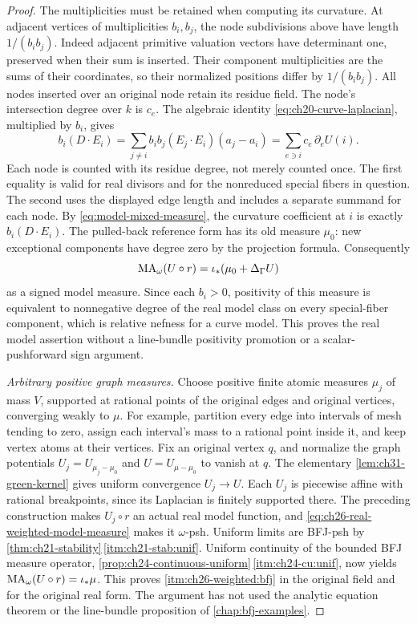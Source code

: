 \begin{proof}
The multiplicities must be retained when computing its curvature.  At
adjacent vertices of multiplicities \(b_i,b_j\), the node subdivisions
above have length \(1/(b_i b_j)\).  Indeed adjacent primitive valuation
vectors have determinant one, preserved when their sum is inserted.
Their component multiplicities are the sums of their coordinates, so
their normalized positions differ by \(1/(b_i b_j)\).
All nodes inserted over an original node retain its residue field.
The node's intersection degree over
\(k\) is \(c_e\).  The algebraic identity
\eqref{eq:ch20-curve-laplacian}, multiplied by \(b_i\), gives
\[
 b_i(D\cdot E_i)
   =\sum_{j\ne i}b_i b_j(E_j\cdot E_i)(a_j-a_i)
   =\sum_{e\ni i}c_e\,\partial_e U(i).
\]
Each node is counted with its residue degree, not merely counted once.
The first equality is valid for real divisors and for the nonreduced
special fibers in question.  The second uses the displayed edge length
and includes a separate summand for each node.
By \eqref{eq:model-mixed-measure}, the curvature coefficient at \(i\)
is exactly \(b_i(D\cdot E_i)\).  The pulled-back reference form has its
old measure \(\mu_0\): new exceptional components have degree zero by
the projection formula.  Consequently
\begin{equation}
\label{eq:ch26-real-weighted-model-measure}
 \operatorname{MA}_\omega(U\circ r)=\iota_*(\mu_0+\Delta_\Gamma U)
\end{equation}
as a signed model measure.  Since each \(b_i>0\), positivity of this
measure is equivalent to nonnegative degree of the real model class on
every special-fiber component, which is relative nefness for a curve
model.  This proves the real model assertion without a line-bundle
positivity promotion or a scalar-pushforward sign argument.

\emph{Arbitrary positive graph measures.}
Choose positive finite atomic measures \(\mu_j\) of mass \(V\), supported
at rational points of the original edges and original vertices, converging
weakly to \(\mu\).  For example, partition every edge into intervals
of mesh tending to zero, assign each interval's mass to a rational point
inside it, and keep vertex atoms at their vertices.
Fix an original vertex \(q\), and normalize the graph potentials
\(U_j=U_{\mu_j-\mu_0}\) and \(U=U_{\mu-\mu_0}\) to vanish at \(q\).
The elementary \cref{lem:ch31-green-kernel} gives uniform convergence
\(U_j\to U\).  Each \(U_j\) is piecewise affine with rational
breakpoints, since its Laplacian is finitely supported there.  The preceding
construction makes \(U_j\circ r\) an actual real model function, and
\eqref{eq:ch26-real-weighted-model-measure} makes it \(\omega\)-psh.
Uniform limits are BFJ-psh by
\cref{thm:ch21-stability}\,\cref{itm:ch21-stab:unif}.
Uniform continuity of the bounded BFJ measure operator,
\cref{prop:ch24-continuous-uniform}\,\cref{itm:ch24-cu:unif}, now yields
\(\operatorname{MA}_\omega(U\circ r)=\iota_*\mu\).
This proves \cref{itm:ch26-weighted:bfj} in the original field and for
the original real form.  The argument has not used the analytic equation
theorem or the line-bundle proposition of \cref{chap:bfj-examples}.


\end{proof}
